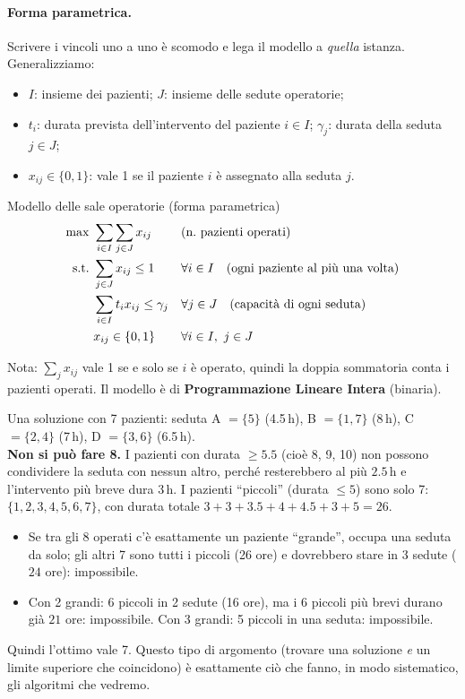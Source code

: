 \paragraph{Forma parametrica.} Scrivere i vincoli uno a uno è scomodo e lega il modello a \emph{quella} istanza. Generalizziamo:
\begin{itemize}[nosep]
  \item $I$: insieme dei pazienti; $J$: insieme delle sedute operatorie;
  \item $t_i$: durata prevista dell'intervento del paziente $i\in I$; $\gamma_j$: durata della seduta $j\in J$;
  \item $x_{ij}\in\{0,1\}$: vale 1 se il paziente $i$ è assegnato alla seduta $j$.
\end{itemize}
\begin{modello}{Modello delle sale operatorie (forma parametrica)}
\begin{align*}
\max\ & \sum_{i\in I}\sum_{j\in J} x_{ij} && \text{(n.\ pazienti operati)}\\
\st\ & \sum_{j\in J} x_{ij}\le 1 && \forall i\in I \quad\text{(ogni paziente al più una volta)}\\
& \sum_{i\in I} t_i x_{ij}\le \gamma_j && \forall j\in J \quad\text{(capacità di ogni seduta)}\\
& x_{ij}\in\{0,1\} && \forall i\in I,\ j\in J
\end{align*}
\end{modello}
Nota: $\sum_{j} x_{ij}$ vale 1 se e solo se $i$ è operato, quindi la doppia sommatoria conta i pazienti operati. Il modello è di \textbf{Programmazione Lineare Intera} (binaria).

\begin{esbox}
Una soluzione con 7 pazienti: seduta A $=\{5\}$ (4.5\,h), B $=\{1,7\}$ (8\,h), C $=\{2,4\}$ (7\,h), D $=\{3,6\}$ (6.5\,h). \\
\textbf{Non si può fare 8.} I pazienti con durata $\ge 5.5$ (cioè 8, 9, 10) non possono condividere la seduta con nessun altro, perché resterebbero al più $2.5$\,h e l'intervento più breve dura 3\,h. I pazienti ``piccoli'' (durata $\le 5$) sono solo 7: $\{1,2,3,4,5,6,7\}$, con durata totale $3+3+3.5+4+4.5+3+5=26$.
\begin{itemize}[nosep]
\item Se tra gli 8 operati c'è esattamente un paziente ``grande'', occupa una seduta da solo; gli altri 7 sono tutti i piccoli (26 ore) e dovrebbero stare in 3 sedute ($24$ ore): impossibile.
\item Con 2 grandi: 6 piccoli in 2 sedute (16 ore), ma i 6 piccoli più brevi durano già $21$ ore: impossibile. Con 3 grandi: 5 piccoli in una seduta: impossibile.
\end{itemize}
Quindi l'ottimo vale 7. Questo tipo di argomento (trovare una soluzione \emph{e} un limite superiore che coincidono) è esattamente ciò che fanno, in modo sistematico, gli algoritmi che vedremo.
\end{esbox}

